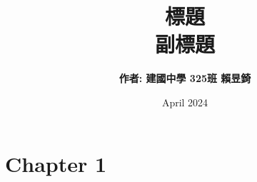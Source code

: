 \documentclass[12pt]{article}
\title{\textbf{標題}\\ \vspace{0.5cm}副標題}
\author{\textbf{作者: 建國中學 325班 賴昱錡}}
\date{April 2024}
\begin{document}
\doublespacing
\maketitle

\newpage
\tableofcontents
\newpage

\section{Chapter 1}

\end{document}
